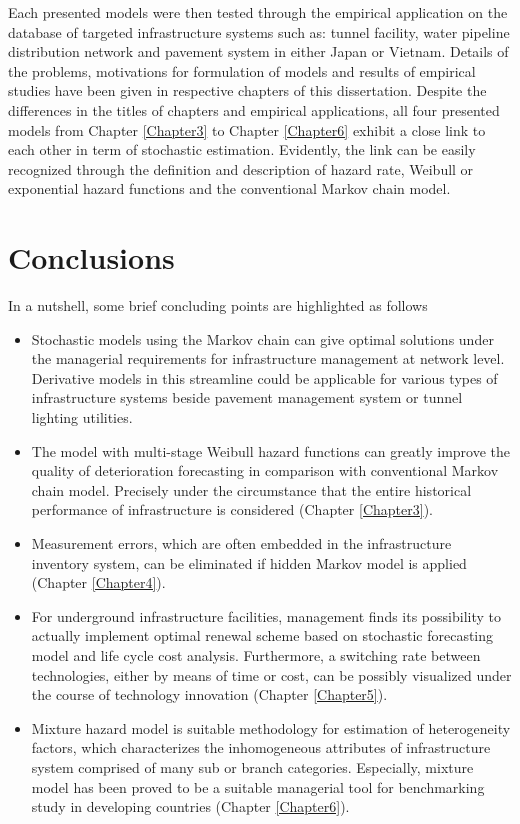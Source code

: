 Each presented models were then tested through the empirical application on the database of targeted infrastructure systems such as: tunnel facility, water pipeline distribution network and pavement system in either Japan or Vietnam. Details of the problems, motivations for formulation of models and results of empirical studies have been given in respective chapters of this dissertation. Despite the differences in the titles of chapters and empirical applications, all four presented models from Chapter \ref{Chapter3} to Chapter \ref{Chapter6} exhibit a close link to each other in term of stochastic estimation. Evidently, the link can be easily recognized through the definition and description of hazard rate, Weibull or exponential hazard functions and the conventional Markov chain model.
\section{Conclusions}
In a nutshell, some brief concluding points are highlighted as follows
\begin{itemize}
 \item Stochastic models using the Markov chain can give optimal solutions under the managerial requirements for infrastructure management at network level. Derivative models in this streamline could be applicable for various types of infrastructure systems beside pavement management system or tunnel lighting utilities.
 \item The model with multi-stage Weibull hazard functions can greatly improve the quality of deterioration forecasting in comparison with conventional Markov chain model. Precisely under the circumstance that the entire historical performance of infrastructure is considered (Chapter \ref{Chapter3}).
  \item Measurement errors, which are often embedded in the infrastructure inventory system, can be eliminated if hidden Markov model is applied (Chapter \ref{Chapter4}). 
  \item For underground infrastructure facilities, management finds its possibility to actually implement optimal renewal scheme based on stochastic forecasting model and life cycle cost analysis. Furthermore, a switching rate between technologies, either by means of time or cost, can be possibly visualized under the course of technology innovation (Chapter \ref{Chapter5}). 
  \item Mixture hazard model is suitable methodology for estimation of heterogeneity factors, which characterizes the inhomogeneous attributes of infrastructure system comprised of many sub or branch categories. Especially, mixture model has been proved to be a suitable managerial tool for benchmarking study in developing countries (Chapter \ref{Chapter6}). 
\end{itemize}%

